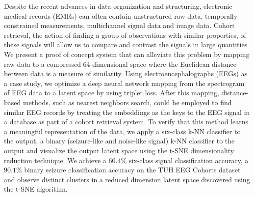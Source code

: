 \begin{abstractlong}
	Despite the recent advances in data organization and structuring, electronic medical records (EMRs) can often contain unstructured raw data, temporally constrained measurements, multichannel signal data and image data. Cohort retrieval, the action of finding a group of observations with similar properties, of these signals will allow us to compare and contrast the signals in large quantities We present a proof of concept system that can alleviate this problem by mapping raw data to a compressed 64-dimensional space where the Euclidean distance between data is a measure of similarity. Using electroencephalographs (EEGs) as a case study, we optimize a deep neural network mapping from the spectrogram of EEG data to a latent space by using triplet loss. After this mapping, distance-based methods, such as nearest neighbors search, could be employed to find similar EEG records by treating the embeddings as the keys to the EEG signal in a database as part of a cohort retrieval system. To verify that this method learns a meaningful representation of the data, we apply a six-class k-NN classifier to the output, a binary (seizure-like and noise-like signal) k-NN classifier to the output and visualize the output latent space using the t-SNE dimensionality reduction technique. We achieve a $60.4\%$ six-class signal classification accuracy, a $90.1\%$ binary seizure classification accuracy on the TUH EEG Cohorts dataset and observe distinct clusters in a reduced dimension latent space discovered using the t-SNE algorithm. 		
\end{abstractlong}